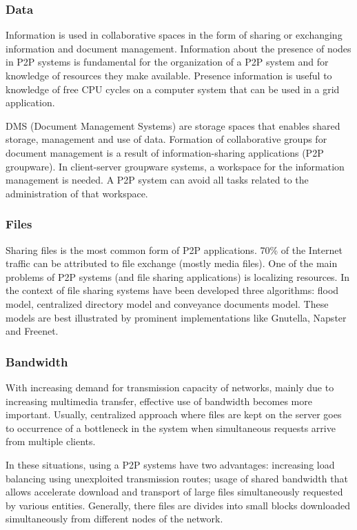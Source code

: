 \subsubsection{Data}

Information is used in collaborative spaces in the form of sharing or exchanging
information and document management. Information about the presence of nodes in
P2P systems is fundamental for the organization of a P2P system and for
knowledge of resources they make available. Presence information is useful to
knowledge of free CPU cycles on a computer system that can be used in a grid
application.

DMS (Document Management Systems) are storage spaces that enables shared storage,
management and use of data. Formation of collaborative groups for document
management is a result of information-sharing applications (P2P groupware). In
client-server groupware systems, a workspace for the information management
is needed. A P2P system can avoid all tasks related to the administration
of that workspace.

\subsubsection{Files}

Sharing files is the most common form of P2P applications. 70\% of the Internet
traffic can be attributed to file exchange (mostly media files). One of the main
problems of P2P systems (and file sharing applications) is localizing resources.
In the context of file sharing systems have been developed three algorithms:
flood model, centralized directory model and conveyance documents model. These
models are best illustrated by prominent implementations like Gnutella, Napster
and Freenet.

\subsubsection{Bandwidth}

With increasing demand for transmission capacity of networks, mainly due to
increasing multimedia transfer, effective use of bandwidth becomes more
important. Usually, centralized approach where files are kept on the server
goes to occurrence of a bottleneck in the system when simultaneous requests
arrive from multiple clients.

In these situations, using a P2P systems have two advantages: increasing load
balancing using unexploited transmission routes; usage of shared bandwidth that
allows accelerate download and transport of large files simultaneously
requested by various entities. Generally, there files are divides into small
blocks downloaded simultaneously from different nodes of the network.

